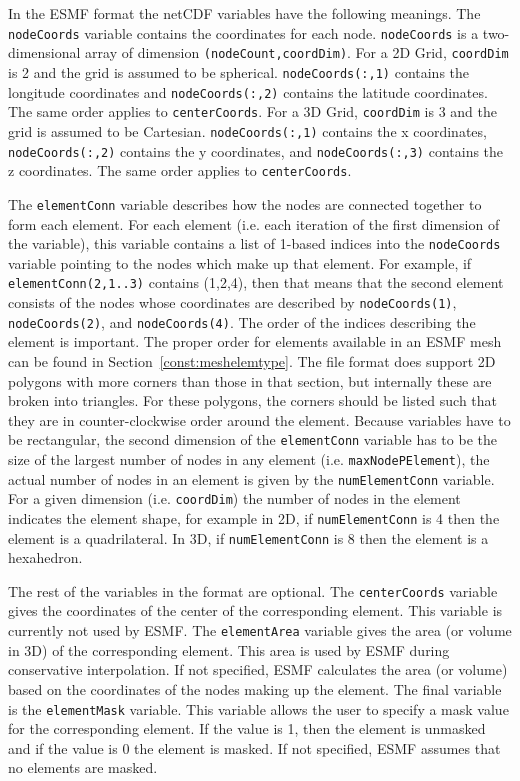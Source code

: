  In the ESMF format the netCDF variables have the following meanings. The {\tt nodeCoords} variable contains the coordinates for each node.
 {\tt nodeCoords} is a two-dimensional array of dimension {\tt (nodeCount,coordDim)}.
 For a 2D Grid, {\tt coordDim} is 2 and the grid is assumed to be spherical. {\tt nodeCoords(:,1)} contains the longitude coordinates and
 {\tt nodeCoords(:,2)} contains the latitude coordinates.  The same order applies to {\tt centerCoords}.
 For a 3D Grid, {\tt coordDim} is 3 and the grid is assumed to be Cartesian. {\tt nodeCoords(:,1)} contains the x coordinates, {\tt nodeCoords(:,2)} contains the y coordinates, 
 and {\tt nodeCoords(:,3)} contains the z coordinates.  The same order applies to {\tt centerCoords}.

 The {\tt elementConn} variable describes how the nodes are connected together to form each element. For each element (i.e. each iteration of the first
 dimension of the variable), this variable contains a list of 1-based indices into the {\tt nodeCoords} variable pointing to the nodes which make up that
 element. For example, if {\tt elementConn(2,1..3)} contains (1,2,4), then that means that the second element consists of the nodes whose coordinates are
 described by {\tt nodeCoords(1)}, {\tt nodeCoords(2)}, and {\tt nodeCoords(4)}. The order of the indices describing the element is important.
 The proper order for elements available in an ESMF mesh can be found in Section~\ref{const:meshelemtype}. The file format does support 2D polygons with more
 corners than those in that section, but internally these are broken into triangles. For these polygons, the corners should
 be listed such that they are in counter-clockwise order around the element.  Because variables have to be rectangular, the second
 dimension of the {\tt elementConn} variable has to be the size of the largest number of nodes in any element (i.e. {\tt maxNodePElement}), the actual number of
 nodes in an element is given by the {\tt numElementConn} variable. For a given dimension (i.e. {\tt coordDim}) the number of nodes in the element
 indicates the element shape, for example in 2D, if {\tt numElementConn} is 4 then the element is a quadrilateral. In 3D, if {\tt numElementConn} is 8
 then the element is a hexahedron.

 The rest of the variables in the format are optional. The {\tt centerCoords} variable gives the coordinates of the center of the corresponding element.
 This variable is currently not used by ESMF. The {\tt elementArea} variable gives the area (or volume in 3D) of the corresponding element. This
 area is used by ESMF during conservative interpolation. If not specified, ESMF calculates the area (or volume) based on the coordinates of the nodes
 making up the element. The final variable is the {\tt elementMask} variable. This variable allows the user to specify a mask value for
 the corresponding element. If the value is 1, then the element is unmasked and if the value is 0 the element is masked.
 If not specified, ESMF assumes that no elements are masked.

